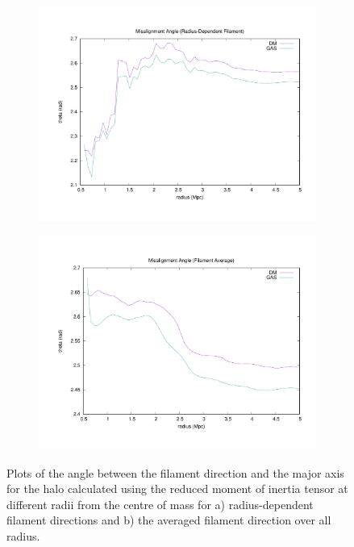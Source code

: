 \documentclass[journal]{IEEEtran}
\begin{document}
\begin{figure}[!t]
\centering
	\begin{subfigure}[t]{0.45\textwidth}
		\centering
		\includegraphics[width=\linewidth]{MisRadc0-001.pdf}
	\end{subfigure}
	\quad
	\begin{subfigure}[t]{0.45\textwidth}
		\centering
		\includegraphics[width=\linewidth]{MisAvec0-001.pdf}
	\end{subfigure}
\label{fig:angleplots}
	\caption{Plots of the angle between the filament direction and the major axis for the halo calculated using the reduced moment of inertia tensor at different radii from the centre of mass for a) radius-dependent filament directions and b) the averaged filament direction over all radius.}
\end{figure}
\end{document}
